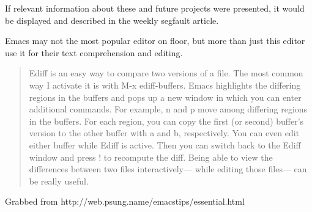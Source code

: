 \documentclass[9pt]{extarticle} %
\begin{document}
\begin{minipage}[t]{.66\linewidth}
If relevant information about these and future projects were presented, it would be displayed and described in the weekly segfault article.

\hypertarget{fourthnews}{} 

Emacs may not the most popular editor on floor, but more than just this editor use it for their text comprehension and editing.

\begin{quote}
Ediff is an easy way to compare two versions of a file. The most common way I activate it is with M-x ediff-buffers. Emacs highlights the differing regions in the buffers and pops up a new window in which you can enter additional commands. For example, n and p move among differing regions in the buffers. For each region, you can copy the first (or second) buffer's version to the other buffer with a and b, respectively. You can even edit either buffer while Ediff is active. Then you can switch back to the Ediff window and press ! to recompute the diff. Being able to view the differences between two files interactively— while editing those files— can be really useful.
\end{quote}
Grabbed from http://web.psung.name/emacstips/essential.html
\end{minipage} %
\end{document}
